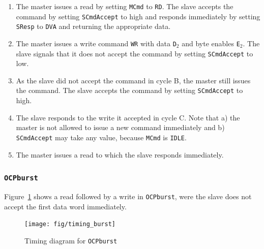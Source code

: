 \documentclass[a4paper,fontsize=10pt,twoside,DIV15,BCOR12mm,headinclude=true,footinclude=false,pagesize,bibtotoc]{scrbook}
\newcommand{\code}[1]{{\texttt{#1}}}
\begin{document}
\begin{enumerate}[A:]
\item The master issues a read by setting \code{MCmd} to
  \code{RD}. The slave accepts the command by setting
  \code{SCmdAccept} to high and responds immediately by setting
  \code{SResp} to \code{DVA} and returning the appropriate data.
\item The master issues a write command \code{WR} with
  data \code{D$_2$} and byte enables \code{E$_2$}. The slave
  signals that it does not accept the command by setting
  \code{SCmdAccept} to low.
\item As the slave did not accept the command in cycle B, the master
  still issues the command. The slave accepts the command by setting
  \code{SCmdAccept} to high.
\item The slave responds to the write it accepted in cycle C. Note
  that a) the master is not allowed to issue a new command immediately
  and b) \code{SCmdAccept} may take any value, because \code{MCmd} is
  \code{IDLE}.
\item The master issues a read to which the slave responds immediately.
\end{enumerate}

\clearpage
\subsubsection{\code{OCPburst}}

Figure~\ref{fig:timing_burst} shows a read followed by a write in
\code{OCPburst}, were the slave does not accept the first data word
immediately.

\begin{figure}
\centering
\texttt{[image: fig/timing\_burst]}
\caption{Timing diagram for \code{OCPburst}}
\label{fig:timing_burst}
\end{figure}
\end{document}
